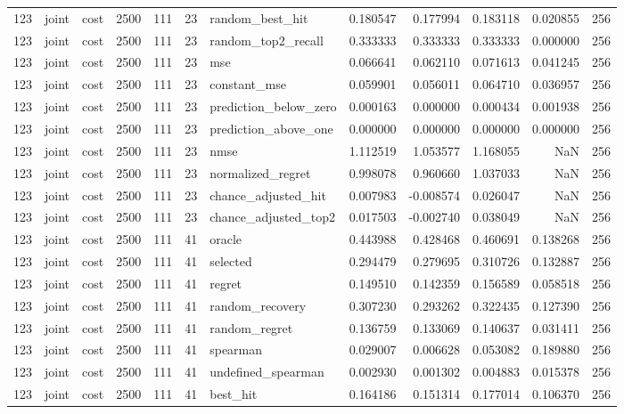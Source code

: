 \begin{tabular}{rllrrrlrrrrr}
123 & joint & cost & 2500 & 111 & 23 & random_best_hit & 0.180547 & 0.177994 & 0.183118 & 0.020855 & 256 \\
123 & joint & cost & 2500 & 111 & 23 & random_top2_recall & 0.333333 & 0.333333 & 0.333333 & 0.000000 & 256 \\
123 & joint & cost & 2500 & 111 & 23 & mse & 0.066641 & 0.062110 & 0.071613 & 0.041245 & 256 \\
123 & joint & cost & 2500 & 111 & 23 & constant_mse & 0.059901 & 0.056011 & 0.064710 & 0.036957 & 256 \\
123 & joint & cost & 2500 & 111 & 23 & prediction_below_zero & 0.000163 & 0.000000 & 0.000434 & 0.001938 & 256 \\
123 & joint & cost & 2500 & 111 & 23 & prediction_above_one & 0.000000 & 0.000000 & 0.000000 & 0.000000 & 256 \\
123 & joint & cost & 2500 & 111 & 23 & nmse & 1.112519 & 1.053577 & 1.168055 & NaN & 256 \\
123 & joint & cost & 2500 & 111 & 23 & normalized_regret & 0.998078 & 0.960660 & 1.037033 & NaN & 256 \\
123 & joint & cost & 2500 & 111 & 23 & chance_adjusted_hit & 0.007983 & -0.008574 & 0.026047 & NaN & 256 \\
123 & joint & cost & 2500 & 111 & 23 & chance_adjusted_top2 & 0.017503 & -0.002740 & 0.038049 & NaN & 256 \\
123 & joint & cost & 2500 & 111 & 41 & oracle & 0.443988 & 0.428468 & 0.460691 & 0.138268 & 256 \\
123 & joint & cost & 2500 & 111 & 41 & selected & 0.294479 & 0.279695 & 0.310726 & 0.132887 & 256 \\
123 & joint & cost & 2500 & 111 & 41 & regret & 0.149510 & 0.142359 & 0.156589 & 0.058518 & 256 \\
123 & joint & cost & 2500 & 111 & 41 & random_recovery & 0.307230 & 0.293262 & 0.322435 & 0.127390 & 256 \\
123 & joint & cost & 2500 & 111 & 41 & random_regret & 0.136759 & 0.133069 & 0.140637 & 0.031411 & 256 \\
123 & joint & cost & 2500 & 111 & 41 & spearman & 0.029007 & 0.006628 & 0.053082 & 0.189880 & 256 \\
123 & joint & cost & 2500 & 111 & 41 & undefined_spearman & 0.002930 & 0.001302 & 0.004883 & 0.015378 & 256 \\
123 & joint & cost & 2500 & 111 & 41 & best_hit & 0.164186 & 0.151314 & 0.177014 & 0.106370 & 256 \\

\end{tabular}
